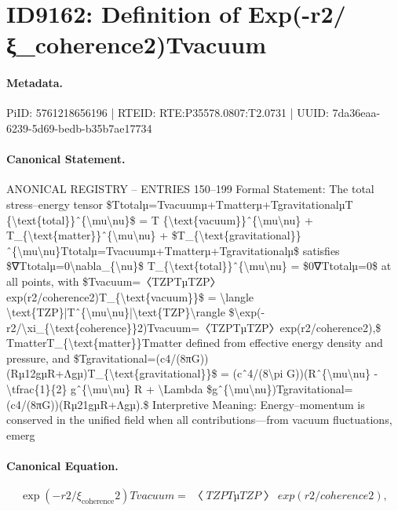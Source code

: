 \section*{ID9162: Definition of Exp(-r2/ξ\_coherence2)Tvacuum}
\paragraph{Metadata.}
PiID: 5761218656196 | RTEID: RTE:P35578.0807:T2.0731 | UUID: 7da36eaa-6239-5d69-bedb-b35b7ae17734

\paragraph{Canonical Statement.}
ANONICAL REGISTRY – ENTRIES 150–199 Formal Statement: The total stress–energy tensor \$Ttotalµ=Tvacuumµ+Tmatterµ+TgravitationalµT \{\textbackslash{}text\{total\}\}ˆ\{\textbackslash{}mu\textbackslash{}nu\}\$ = T \{\textbackslash{}text\{vacuum\}\}ˆ\{\textbackslash{}mu\textbackslash{}nu\} + T\_\{\textbackslash{}text\{matter\}\}ˆ\{\textbackslash{}mu\textbackslash{}nu\} + \$T\_\{\textbackslash{}text\{gravitational\}\}ˆ\{\textbackslash{}mu\textbackslash{}nu\}Ttotalµ=Tvacuumµ+Tmatterµ+Tgravitationalµ\$ satisfies \$∇Ttotalµ=0\textbackslash{}nabla\_\{\textbackslash{}nu\}\$ T\_\{\textbackslash{}text\{total\}\}ˆ\{\textbackslash{}mu\textbackslash{}nu\} = \$0∇Ttotalµ=0\$ at all points, with \$Tvacuum=〈TZPTµTZP〉exp(r2/coherence2)T\_\{\textbackslash{}text\{vacuum\}\}\$ = \textbackslash{}langle \textbackslash{}text\{TZP\}|Tˆ\{\textbackslash{}mu\textbackslash{}nu\}|\textbackslash{}text\{TZP\}\textbackslash{}rangle \$\textbackslash{}exp(-r2/\textbackslash{}xi\_\{\textbackslash{}text\{coherence\}\}2)Tvacuum=〈TZPTµTZP〉exp(r2/coherence2),\$ TmatterT\_\{\textbackslash{}text\{matter\}\}Tmatter defined from effective energy density and pressure, and \$Tgravitational=(c4/(8πG))(Rµ12gµR+Λgµ)T\_\{\textbackslash{}text\{gravitational\}\}\$ = (cˆ4/(8\textbackslash{}pi G))(Rˆ\{\textbackslash{}mu\textbackslash{}nu\} -\textbackslash{}tfrac\{1\}\{2\} gˆ\{\textbackslash{}mu\textbackslash{}nu\} R + \textbackslash{}Lambda \$gˆ\{\textbackslash{}mu\textbackslash{}nu\})Tgravitational=(c4/(8πG))(Rµ21gµR+Λgµ).\$ Interpretive Meaning: Energy–momentum is conserved in the unified field when all contributions—from vacuum fluctuations, emerg

\paragraph{Canonical Equation.}
\[
\exp(-r2/\xi_{\text{coherence}}2)Tvacuum=〈TZPTµTZP〉exp(r2/coherence2),
\]

